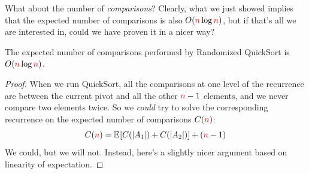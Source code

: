 What about the number of \emph{comparisons}? Clearly, what we just showed implies that the expected number of comparisons is also $\bigO{\ns\log\ns}$, but if that's all we are interested in, could we have proven it in a nicer way?
\begin{theorem}
    The expected number of comparisons performed by Randomized QuickSort is $\bigO{\ns\log\ns}$.
\end{theorem}
\begin{proof}
    When we run QuickSort, all the comparisons at one level of the recurrence are between the current pivot and all the other ${\textcolor{red}{n}}-1$ elements, and we never compare two elements twice. So we \emph{could} try to solve the corresponding recurrence on the expected number of comparisons $C({\textcolor{red}{n}})$:
    \begin{equation}
    \label{eq:quicksort:comparisons}
    C(\ns) = \bEE{C(|A_1|) + C(|A_2|)} + (\ns-1)
    \end{equation}
    We could, but we will not. Instead, here's a slightly nicer argument based on linearity of expectation.


\end{proof}
